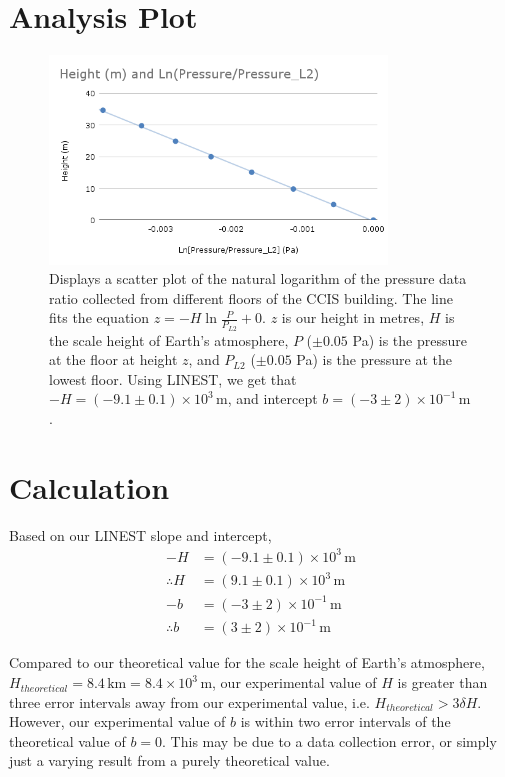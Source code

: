 \documentclass[12pt]{article}
\begin{document}
\section{Analysis Plot}
\begin{figure}[h]
    \centering
    \includegraphics[width=0.8\textwidth]{Height-LogData.png}
    \caption{Displays a scatter plot of the natural logarithm of the pressure data ratio collected from different floors of the CCIS building.
    The line fits the equation $z = -H\ln\frac{P}{P_{L2}} + 0$.
    $z$ is our height in metres, $H$ is the scale height of Earth's atmosphere, 
    $P$ ($\pm 0.05$ Pa) is the pressure at the floor at height $z$,
    and $P_{L2}$ ($\pm 0.05$ Pa) is the pressure at the lowest floor.
    Using LINEST, we get that $-H = (-9.1 \pm 0.1) \times 10^3 \, \mathrm{m}$,
    and intercept $b = (-3 \pm 2) \times 10^{-1}\, \mathrm{m}$.}
\end{figure}

\section{Calculation}
Based on our LINEST slope and intercept, 
\begin{align*}
    -H &= (-9.1 \pm 0.1) \times 10^3 \, \mathrm{m} \\
    \therefore H &= (9.1 \pm 0.1) \times 10^3 \, \mathrm{m} \\
    -b &= (-3 \pm 2) \times 10^{-1}\, \mathrm{m} \\
    \therefore b &=(3 \pm 2) \times 10^{-1}\, \mathrm{m}
\end{align*}

Compared to our theoretical value for the scale height of Earth's atmosphere, $H_{theoretical} = 8.4 \, \mathrm{km} = 8.4 \times 10^3\, \mathrm{m}$,
our experimental value of $H$ is greater than three error intervals away from our experimental value,
i.e. $H_{theoretical} >3 \delta H$.
However, our experimental value of $b$ is within two error intervals of the theoretical value of $b = 0$.
This may be due to a data collection error, or simply just a varying result from a purely theoretical value.
\end{document}
